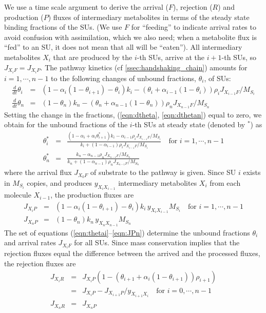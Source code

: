 We use a time scale argument to derive the arrival ($F$), rejection ($R$) and production ($P$) fluxes of intermediary metabolites in terms of the steady state binding fractions of the SUs. 
(We use $F$ for ``feeding'' to indicate arrival rates to avoid confusion with assimilation, which we also need; when a metabolite flux is ``fed'' to an SU, it does not mean that all will be ``eaten''). 
All intermediary metabolites $X_i$ that are produced by the $i$-th SUs, arrive at the $i+1$-th SUs, so $J_{X_i F} = J_{X_i P}$. 
The pathway kinetics (cf \ref{ssec:handshaking_chain}) amounts for $i = 1,\cdots, n - 1$ to the following changes of unbound fractions, $\theta_i$, of SUs:
\begin{eqnarray}\label{eqn:dtheta}
  \frac{d} {dt} \theta_i &=& 
  \left( 1- \alpha_i (1 - \theta_{i+1}) - \theta_i \right) k_i - 
  \left(\theta_i + \alpha_{i-1} (1 - \theta_i) \right) 
  \rho_i J_{X_{i-1} F}/ M_{S_i}
  \\\label{eqn:dthetan}
  \frac{d} {dt} \theta_n &=& (1 - \theta_n) k_n - 
  \left( \theta_n + \alpha_{n-1} (1 - \theta_n) \right) 
  \rho_n J_{X_{n-1} F}/ M_{S_n}
\end{eqnarray}
Setting the change in the fractions, (\ref{eqn:dtheta}, \ref{eqn:dthetan}) equal to zero, we obtain for the unbound
fractions of the $i$-th SUs at steady state (denoted by $^*$) as
\begin{eqnarray}\label{eqn:thetai}
  \theta_i^* &=& \frac
    {(1 - \alpha_i + \alpha_i \theta_{i+1}^*) k_i - \alpha_{i-1} 
     \rho_i J_{X_{i-1} F}/ M_{S_i}}
    {k_i + (1 - \alpha_{i-1}) \rho_i J_{X_{i-1} F}/ M_{S_i}}
  \quad \mbox{for } i = 1, \cdots, n-1
\\\label{eqn:thetan}
 \theta_n^* &=& 
   \frac{k_n - \alpha_{n-1} \rho_n J_{X_{n-1} F}/ M_{S_n}} 
   {k_n + (1 - \alpha_{n-1}) \rho_n J_{X_{n-1} F}/ M_{S_n}}
\end{eqnarray}
where the arrival flux $J_{X_0 F}$ of substrate to the pathway is given. Since SU $i$ exists in $M_{S_i}$ copies, and produces $y_{X_i X_{i-1}}$ intermediary metabolites $X_i$ from each molecule $X_{i-1}$, the production fluxes are
\begin{eqnarray}\label{eqn:JPi}
  J_{X_i P} & = & \left( 1- \alpha_i (1 - \theta_{i+1}) - 
  \theta_i \right) k_i \, y_{X_i X_{i-1}} M_{S_i}
  \quad \mbox{for } i = 1, \cdots, n-1
\\\label{eqn:JPn}
  J_{X_n P} & = & (1 - \theta_n) k_n \, 
  y_{X_n X_{n-1}} M_{S_n}
\end{eqnarray}
The set of equations (\ref{eqn:thetai}--\ref{eqn:JPn}) determine the unbound fractions $\theta_i$ and arrival rates $J_{X_i F}$ for all SUs. 
Since mass conservation implies that the rejection fluxes equal the difference between the arrived and the processed fluxes, the rejection fluxes are
\begin{eqnarray}\label{eqn:JRi}
  J_{X_i R} & = & J_{X_i P} \left( 1 - 
     \left(\theta_{i+1} + \alpha_i (1 - \theta_{i+1}) \right) 
     \rho_{i+1} \right) \\
  & = & J_{X_i P} - J_{X_{i+1} P}/ y_{X_{i+1} X_i}
  \quad \mbox{for } i = 0, \cdots, n-1
\\\label{eqn:JRn}
  J_{X_n R} & = & J_{X_n P} 
\end{eqnarray}

